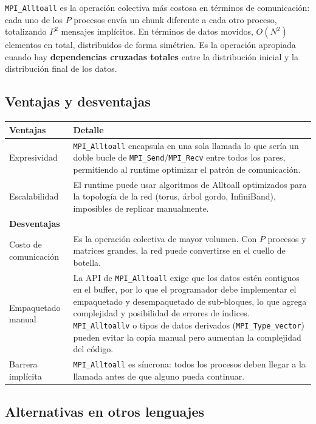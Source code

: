 \documentclass[12pt,a4paper]{article}
\begin{document}
\texttt{MPI\_Alltoall} es la operación colectiva más costosa en términos de
comunicación: cada uno de los $P$ procesos envía un chunk diferente a cada otro
proceso, totalizando $P^2$ mensajes implícitos. En términos de datos movidos,
$O(N^2)$ elementos en total, distribuidos de forma simétrica. Es la operación
apropiada cuando hay \textbf{dependencias cruzadas totales} entre la distribución
inicial y la distribución final de los datos.

\subsection{Ventajas y desventajas}

\begin{longtable}{L{4cm} L{10cm}}
\toprule
\textbf{Ventajas} & \textbf{Detalle} \\
\midrule
\endhead
Expresividad & \texttt{MPI\_Alltoall} encapsula en una sola llamada lo que
  sería un doble bucle de \texttt{MPI\_Send}/\texttt{MPI\_Recv} entre todos
  los pares, permitiendo al runtime optimizar el patrón de comunicación. \\[4pt]
Escalabilidad & El runtime puede usar algoritmos de Alltoall optimizados para
  la topología de la red (torus, árbol gordo, InfiniBand), imposibles de
  replicar manualmente. \\
\midrule
\textbf{Desventajas} & \\
\midrule
Costo de comunicación & Es la operación colectiva de mayor volumen. Con $P$
  procesos y matrices grandes, la red puede convertirse en el cuello de botella. \\[4pt]
Empaquetado manual & La API de \texttt{MPI\_Alltoall} exige que los datos
  estén contiguos en el buffer, por lo que el programador debe implementar
  el empaquetado y desempaquetado de sub-bloques, lo que agrega complejidad
  y posibilidad de errores de índices. \texttt{MPI\_Alltoallv} o tipos de datos
  derivados (\texttt{MPI\_Type\_vector}) pueden evitar la copia manual pero
  aumentan la complejidad del código. \\[4pt]
Barrera implícita & \texttt{MPI\_Alltoall} es síncrona: todos los procesos deben
  llegar a la llamada antes de que alguno pueda continuar. \\
\bottomrule
\end{longtable}

\subsection{Alternativas en otros lenguajes}
\end{document}
